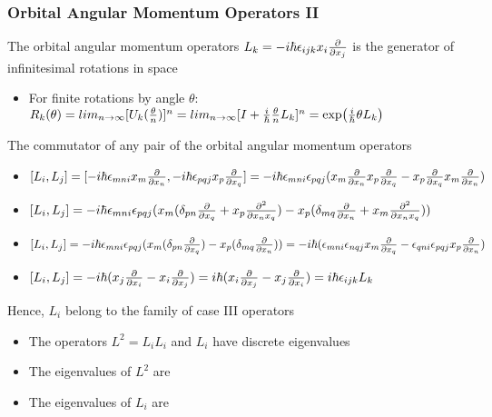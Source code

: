 \documentclass[8pt,t,mathserif,aspectratio=169]{beamer}
\begin{document}
\begin{frame}
  \frametitle{Orbital Angular Momentum Operators II}
  \vspace{1mm}
  The orbital angular momentum operators $L_k = -i \hbar \epsilon_{ijk} x_i {\partial \over \partial x_j}$ is the generator of infinitesimal rotations in space
  \begin{itemize}
    \item For finite rotations by angle $\theta$: $R_k(\theta) = lim_{n \to \infty} [U_{k}({\theta \over n})]^n = lim_{n \to \infty} [I + {i \over \hbar} {\theta \over n} L_k]^n = \exp({i \over \hbar} \theta L_k)$
  \end{itemize}
  The commutator of any pair of the orbital angular momentum operators
  \begin{itemize}
    \item $[L_i,L_j] = [-i \hbar \epsilon_{mni} x_m {\partial \over \partial x_n},-i \hbar \epsilon_{pqj} x_p {\partial \over \partial x_q}] = -i \hbar \epsilon_{mni} \epsilon_{pqj} (x_m {\partial \over \partial x_n} x_p {\partial \over \partial x_q} - x_p {\partial \over \partial x_q} x_m {\partial \over \partial x_n})$
    \item $[L_i,L_j] = -i \hbar \epsilon_{mni} \epsilon_{pqj} (x_m (\delta_{pn} {\partial \over \partial x_q} + x_p {\partial^2 \over \partial x_n x_q}) - x_p (\delta_{mq} {\partial \over \partial x_n} + x_m {\partial^2 \over \partial x_n x_q}))$
    \item $[L_i,L_j] = -i \hbar \epsilon_{mni} \epsilon_{pqj} (x_m (\delta_{pn} {\partial \over \partial x_q}) - x_p (\delta_{mq} {\partial \over \partial x_n})) = -i \hbar (\epsilon_{mni} \epsilon_{nqj} x_m {\partial \over \partial x_q} - \epsilon_{qni} \epsilon_{pqj} x_p {\partial \over \partial x_n})$
    \item $[L_i,L_j] = -i \hbar (x_j {\partial \over \partial x_i} - x_i {\partial \over \partial x_j}) = i \hbar (x_i {\partial \over \partial x_j} - x_j {\partial \over \partial x_i}) = i \hbar \epsilon_{ijk} L_k$
  \end{itemize}
  Hence, $L_i$ belong to the family of case III operators
  \begin{itemize}
    \item The operators $L^2 = L_i L_i$ and $L_i$ have discrete eigenvalues
    \item The eigenvalues of $L^2$ are 
    \item The eigenvalues of $L_i$ are
  \end{itemize}
\end{frame}
\end{document}
